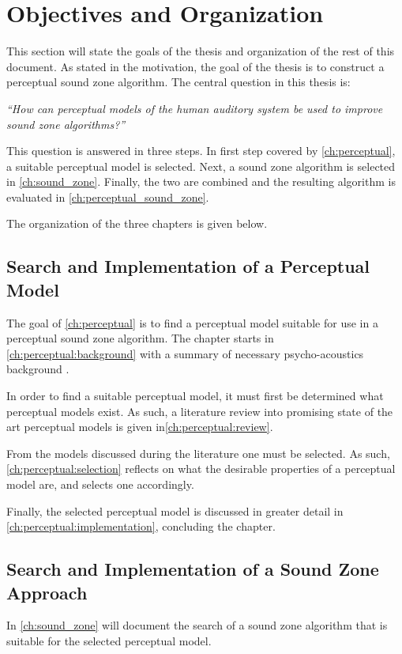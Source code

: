 \section{Objectives and Organization}
\label{ch:introduction:objectives}
This section will state the goals of the thesis and organization of the rest of this document.
As stated in the motivation, the goal of the thesis is to construct a perceptual sound zone algorithm.
The central question in this thesis is: 

{\centering\textit{``How can perceptual models of the human auditory system be used to improve sound zone algorithms?''}}

This question is answered in three steps. 
In first step covered by \autoref{ch:perceptual}, a suitable perceptual model is selected.
Next, a sound zone algorithm is selected in \autoref{ch:sound_zone}.
Finally, the two are combined and the resulting algorithm is evaluated in \autoref{ch:perceptual_sound_zone}.

The organization of the three chapters is given below.

\subsection{Search and Implementation of a Perceptual Model}
\label{ch:introduction:objectives:perceptual}
The goal of \autoref{ch:perceptual} is to find a perceptual model suitable for use in a perceptual sound zone algorithm.
The chapter starts in \autoref{ch:perceptual:background} with a summary of necessary psycho-acoustics background .

In order to find a suitable perceptual model, it must first be determined what perceptual models exist.
As such, a literature review into promising state of the art perceptual models is given in\autoref{ch:perceptual:review}.

From the models discussed during the literature one must be selected.
As such, \autoref{ch:perceptual:selection} reflects on what the desirable properties of a perceptual model are, and selects one accordingly. 

Finally, the selected perceptual model is discussed in greater detail in \autoref{ch:perceptual:implementation}, concluding the chapter. 

\subsection{Search and Implementation of a Sound Zone Approach}
\label{ch:introduction:objectives:sound_zone}
In \autoref{ch:sound_zone} will document the search of a sound zone algorithm that is suitable for the selected perceptual model.

